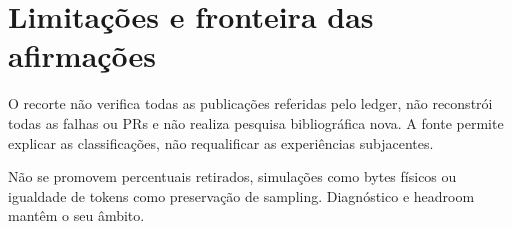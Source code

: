 \section{Limitações e fronteira das afirmações}
O recorte não verifica todas as publicações referidas pelo ledger, não reconstrói todas as falhas ou PRs e não realiza pesquisa bibliográfica nova. A fonte permite explicar as classificações, não requalificar as experiências subjacentes. 

Não se promovem percentuais retirados, simulações como bytes físicos ou igualdade de tokens como preservação de sampling. Diagnóstico e headroom mantêm o seu âmbito.
